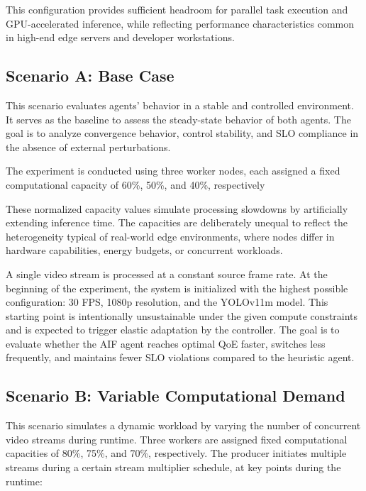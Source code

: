 This configuration provides sufficient headroom for parallel task execution and GPU-accelerated inference, while reflecting performance characteristics common in high-end edge servers and developer workstations.

\subsection{Scenario A: Base Case}
\label{sec:evaluation-base}

This scenario evaluates agents' behavior in a stable and controlled environment. It serves as the baseline to assess the steady-state behavior of both agents. The goal is to analyze convergence behavior, control stability, and SLO compliance in the absence of external perturbations.

The experiment is conducted using three worker nodes, each assigned a fixed computational capacity of 60\%, 50\%, and 40\%, respectively

These normalized capacity values simulate processing slowdowns by artificially extending inference time. The capacities are deliberately unequal to reflect the heterogeneity typical of real-world edge environments, where nodes differ in hardware capabilities, energy budgets, or concurrent workloads.

A single video stream is processed at a constant source frame rate. At the beginning of the experiment, the system is initialized with the highest possible configuration: 30 FPS, 1080p resolution, and the YOLOv11m model. This starting point is intentionally unsustainable under the given compute constraints and is expected to trigger elastic adaptation by the controller. The goal is to evaluate whether the AIF agent reaches optimal QoE faster, switches less frequently, and maintains fewer SLO violations compared to the heuristic agent.

\subsection{Scenario B: Variable Computational Demand}
\label{sec:evaluation-variable-demand}

This scenario simulates a dynamic workload by varying the number of concurrent video streams during runtime. Three workers are assigned fixed computational capacities of 80\%, 75\%, and 70\%, respectively. The producer initiates multiple streams during a certain stream multiplier schedule, at key points during the runtime:

